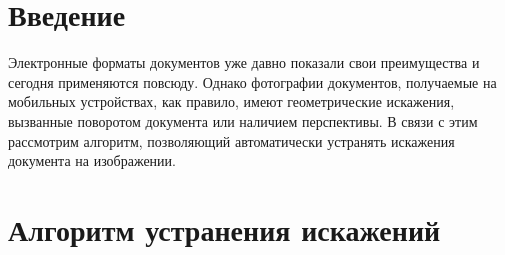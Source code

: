 \documentclass[a4paper,10pt,twoside]{article}
\begin{document}
%

%
%
\begin{multicols}{2}
%
\section*{%
Введение}%
Электронные форматы документов уже давно показали свои преимущества и сегодня применяются повсюду. Однако фотографии документов, получаемые на мобильных устройствах, как правило, имеют геометрические искажения, вызванные поворотом документа или наличием перспективы. В связи с этим рассмотрим алгоритм, позволяющий автоматически устранять искажения документа на изображении.

%
\section{%
Алгоритм устранения искажений
}
\end{multicols}
\end{document}
